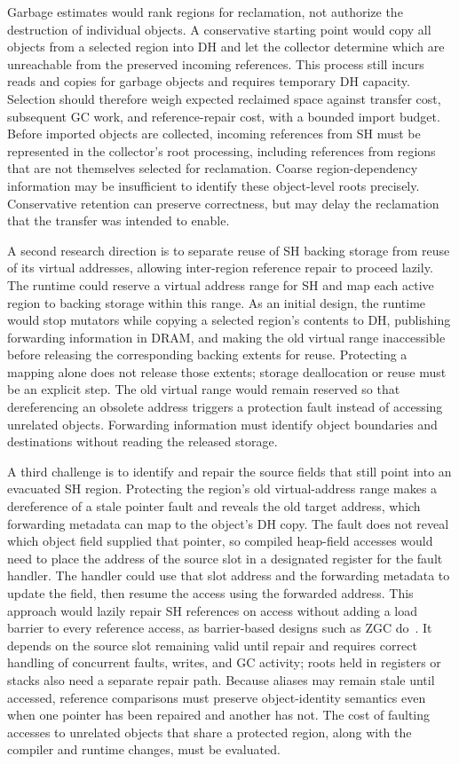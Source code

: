 Garbage estimates would rank regions for reclamation, not authorize the destruction of individual objects.
A conservative starting point would copy all objects from a selected region into DH and let the collector determine which are unreachable from the preserved incoming references.
This process still incurs reads and copies for garbage objects and requires temporary DH capacity.
Selection should therefore weigh expected reclaimed space against transfer cost, subsequent GC work, and reference-repair cost, with a bounded import budget.
Before imported objects are collected, incoming references from SH must be represented in the collector's root processing, including references from regions that are not themselves selected for reclamation.
Coarse region-dependency information may be insufficient to identify these object-level roots precisely.
Conservative retention can preserve correctness, but may delay the reclamation that the transfer was intended to enable.

A second research direction is to separate reuse of SH backing storage from reuse of its virtual addresses, allowing inter-region reference repair to proceed lazily.
The runtime could reserve a virtual address range for SH and map each active region to backing storage within this range.
As an initial design, the runtime would stop mutators while copying a selected region's contents to DH, publishing forwarding information in DRAM, and making the old virtual range inaccessible before releasing the corresponding backing extents for reuse.
Protecting a mapping alone does not release those extents; storage deallocation or reuse must be an explicit step.
The old virtual range would remain reserved so that dereferencing an obsolete address triggers a protection fault instead of accessing unrelated objects.
Forwarding information must identify object boundaries and destinations without reading the released storage.

A third challenge is to identify and repair the source fields that still point into an evacuated SH region.
Protecting the region's old virtual-address range makes a dereference of a stale pointer fault and reveals the old target address, which forwarding metadata can map to the object's DH copy.
The fault does not reveal which object field supplied that pointer, so compiled heap-field accesses would need to place the address of the source slot in a designated register for the fault handler.
The handler could use that slot address and the forwarding metadata to update the field, then resume the access using the forwarded address.
This approach would lazily repair SH references on access without adding a load barrier to every reference access, as barrier-based designs such as ZGC do~\cite{yang:zgc}.
It depends on the source slot remaining valid until repair and requires correct handling of concurrent faults, writes, and GC activity; roots held in registers or stacks also need a separate repair path.
Because aliases may remain stale until accessed, reference comparisons must preserve object-identity semantics even when one pointer has been repaired and another has not.
The cost of faulting accesses to unrelated objects that share a protected region, along with the compiler and runtime changes, must be evaluated.

